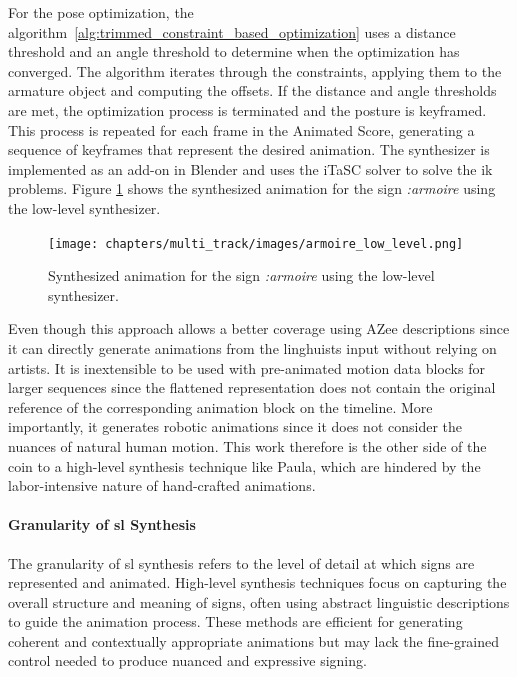 \documentclass[../../main.tex]{subfiles}
\begin{document}
For the pose optimization, the algorithm~\ref{alg:trimmed_constraint_based_optimization} uses a distance threshold and an angle threshold to determine when the optimization has converged. The algorithm iterates through the constraints, applying them to the armature object and computing the offsets. If the distance and angle thresholds are met, the optimization process is terminated and the posture is keyframed. This process is repeated for each frame in the Animated Score, generating a sequence of keyframes that represent the desired animation. The synthesizer is implemented as an add-on in Blender and uses the iTaSC solver to solve the \gls{ik} problems. Figure \ref{fig:armoire_low_level} shows the synthesized animation for the sign \emph{:armoire} using the low-level synthesizer.

\begin{figure}
  \centering
  \texttt{[image: chapters/multi\_track/images/armoire\_low\_level.png]}
  \caption{Synthesized animation for the sign \emph{:armoire} using the low-level synthesizer.}
  \label{fig:armoire_low_level}
\end{figure}

Even though this approach allows a better coverage using AZee descriptions since it can directly generate animations from the linghuists input without relying on artists. It is inextensible to be used with pre-animated motion data blocks for larger sequences since the flattened representation does not contain the original reference of the corresponding animation block on the timeline. More importantly, it generates robotic animations since it does not consider the nuances of natural human motion. This work therefore is the other side of the coin to a high-level synthesis technique like Paula, which are hindered by the labor-intensive nature of hand-crafted animations.

\paragraph{Granularity of \gls{sl} Synthesis}
\label{ch:background_work:sign_language_synthesis:3d_techniques:sign_language_synthesis_systems:granularity_of_sl_synthesis}

The granularity of \gls{sl} synthesis refers to the level of detail at which signs are represented and animated. High-level synthesis techniques focus on capturing the overall structure and meaning of signs, often using abstract linguistic descriptions to guide the animation process. These methods are efficient for generating coherent and contextually appropriate animations but may lack the fine-grained control needed to produce nuanced and expressive signing.
\end{document}
